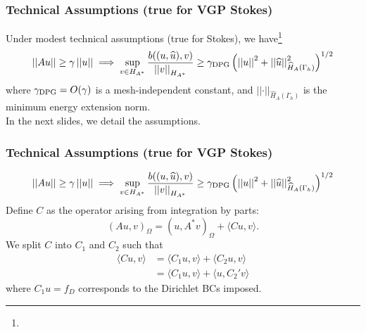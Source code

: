 \documentclass[mathserif]{beamer}
\newcommand{\NVRnorm}[1]{\left|\left|#1\right|\right|}
\newcommand{\FootSize}{\scriptsize}
\begin{document}
\addtocounter{framenumber}{-1} %
\begin{frame}
\frametitle{Technical Assumptions (true for VGP Stokes)}
Under modest technical assumptions (true for Stokes), we have\footnote{\FootSize {}}\\
\[
\NVRnorm{Au} \geq \gamma \NVRnorm{u} \implies \sup_{v \in H_{A^{*}}} \frac{b((u,\widehat{u}),v)}{\NVRnorm{v}_{H_{A^{*}}}} \geq \gamma_{\rm DPG} \left(\NVRnorm{u}^{2} + \NVRnorm{\widehat{u}}^{2}_{\widehat{H}_{A}(\Gamma_{h})}\right)^{1/2}
\]
where $\gamma_{\rm DPG} = O(\gamma)$ is a mesh-independent constant, and $\NVRnorm{\cdot}_{\widehat{H}_{A}(\Gamma_{h})}$ is the minimum energy extension norm.\\
\vspace{5mm}
In the next slides, we detail the assumptions.
\end{frame}
\addtocounter{framenumber}{-1} %
\begin{frame}
\frametitle{Technical Assumptions (true for VGP Stokes)}
\[
\NVRnorm{Au} \geq \gamma \NVRnorm{u} \implies \sup_{v \in H_{A^{*}}} \frac{b((u,\widehat{u}),v)}{\NVRnorm{v}_{H_{A^{*}}}} \geq \gamma_{\rm DPG} \left(\NVRnorm{u}^{2} + \NVRnorm{\widehat{u}}^{2}_{\widehat{H}_{A}(\Gamma_{h})}\right)^{1/2}
\]
Define $C$ as the operator arising from integration by parts:
\[
(Au,v)_{\Omega} = (u, A^{*}v)_{\Omega} + \langle Cu, v \rangle.
\]
We split $C$ into $C_{1}$ and $C_{2}$ such that 
\begin{align*}
\langle Cu, v \rangle &= \langle C_{1}u, v \rangle + \langle C_{2}u, v \rangle \\
&= \langle C_{1}u, v \rangle + \langle u, C_{2}'v \rangle
\end{align*}
where $C_{1}u = f_{D}$ corresponds to the Dirichlet BCs imposed. \\
\end{frame}
\addtocounter{framenumber}{-1} %
\end{document}
